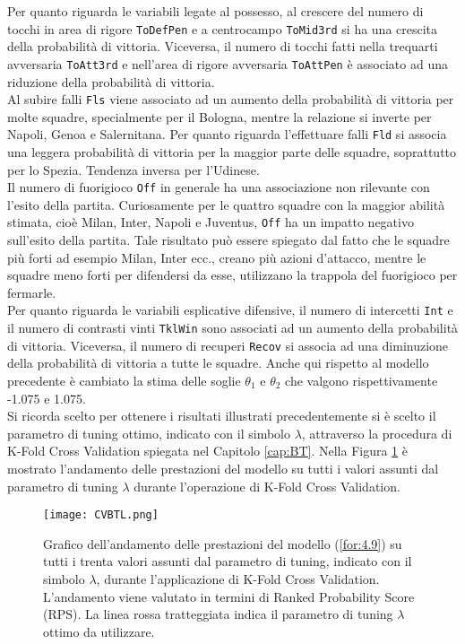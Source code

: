Per quanto riguarda le variabili legate al possesso, al crescere del numero di tocchi in area di rigore \texttt{ToDefPen} e a centrocampo \texttt{ToMid3rd} si ha una crescita della probabilità di vittoria. Viceversa, il numero di tocchi fatti nella trequarti avversaria \texttt{ToAtt3rd} e nell'area di rigore avversaria \texttt{ToAttPen} è associato ad una riduzione della probabilità di vittoria.\\
Al subire falli \texttt{Fls} viene associato ad un aumento della probabilità di vittoria per molte squadre, specialmente per il Bologna, mentre la relazione si inverte per Napoli, Genoa e Salernitana. Per quanto riguarda l'effettuare falli \texttt{Fld} si associa una leggera probabilità di vittoria per la maggior parte delle squadre, soprattutto per lo Spezia. Tendenza inversa per l'Udinese.\\
Il numero di fuorigioco \texttt{Off} in generale ha una associazione non rilevante con l'esito della partita. Curiosamente per le quattro squadre con la maggior abilità stimata, cioè Milan, Inter, Napoli e Juventus, \texttt{Off} ha un impatto negativo sull'esito della partita. Tale risultato può essere spiegato dal fatto che le squadre più forti ad esempio Milan, Inter ecc., creano più azioni d'attacco, mentre le squadre meno forti per difendersi da esse, utilizzano la trappola del fuorigioco per fermarle.\\
Per quanto riguarda le variabili esplicative difensive, il numero di intercetti \texttt{Int} e il numero di contrasti vinti \texttt{TklWin} sono associati ad un aumento della probabilità di vittoria. Viceversa, il numero di recuperi \texttt{Recov} si associa ad una diminuzione della probabilità di vittoria a tutte le squadre. Anche qui rispetto al modello precedente è cambiato la stima delle soglie $\theta_1$ e $\theta_2$ che valgono rispettivamente -1.075 e 1.075.\\
Si ricorda scelto per ottenere i risultati illustrati precedentemente si è scelto il parametro di tuning ottimo, indicato con il simbolo $\lambda$, attraverso la procedura di K-Fold Cross Validation spiegata nel Capitolo \ref{cap:BT}. Nella Figura \ref{fig:lambda1} è mostrato l'andamento delle prestazioni del modello su tutti i valori assunti dal parametro di tuning $\lambda$ durante l'operazione di K-Fold Cross Validation.
\begin{figure}[h]
	\begin{center}
		\texttt{[image: CVBTL.png]}
		\caption{Grafico dell'andamento delle prestazioni del modello (\ref{for:4.9}) su tutti i trenta valori assunti dal parametro di tuning, indicato con il simbolo $\lambda$, durante l'applicazione di K-Fold Cross Validation. L'andamento viene valutato in termini di Ranked Probability Score (RPS). La linea rossa tratteggiata indica il parametro di tuning $\lambda$ ottimo da utilizzare.} \label{fig:lambda1}
	\end{center}
\end{figure}
